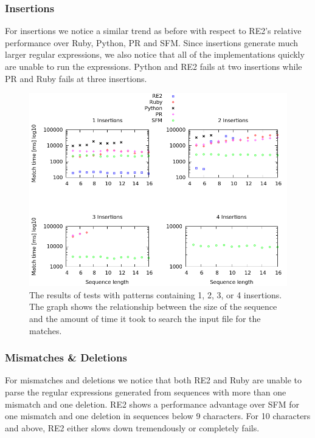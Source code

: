 \documentclass[12pt]{article}
\theoremstyle{definition}
\begin{document}
\subsubsection{Insertions}

For insertions we notice a similar trend as before with respect to RE2's relative performance over Ruby, Python, PR and SFM. Since insertions generate much larger regular expressions, we also notice that all of the implementations quickly are unable to run the expressions. Python and RE2 fails at two insertions while PR and Ruby fails at three insertions.

\begin{figure}[H]
	\begin{center}
		\includegraphics[scale=0.55]{graphs/insertions.png}	
	\end{center}
	\caption{The results of tests with patterns containing 1, 2, 3, or 4 insertions. The graph shows the relationship between the size of the sequence and the amount of time it took to search the input file for the matches.}
	\label{graph:cases:insertions}
\end{figure}

\subsubsection{Mismatches \& Deletions}

For mismatches and deletions we notice that both RE2 and Ruby are unable to parse the regular expressions generated from sequences with more than one mismatch and one deletion. RE2 shows a performance advantage over SFM for one mismatch and one deletion in sequences below 9 characters. For 10 characters and above, RE2 either slows down tremendously or completely fails.
\end{document}
